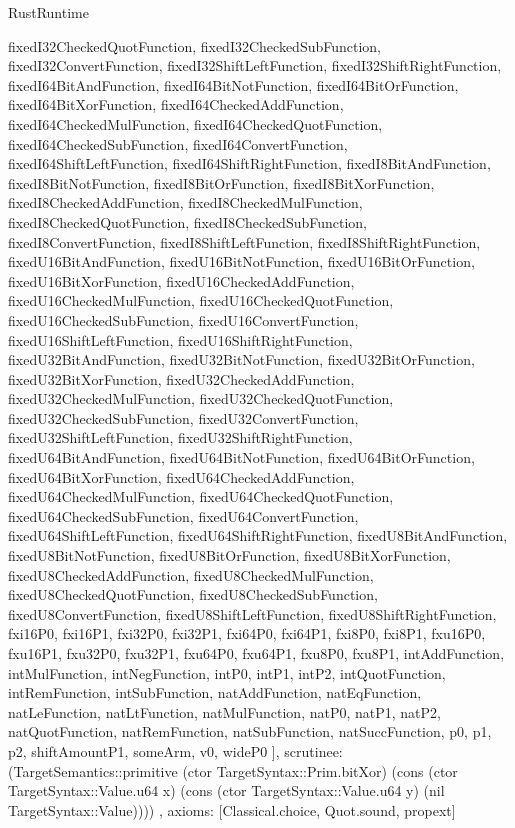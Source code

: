 \begin{lexlean}{RustRuntime}
\begin{semanticmodule}
{{      fixedI32CheckedQuotFunction,
      fixedI32CheckedSubFunction,
      fixedI32ConvertFunction,
      fixedI32ShiftLeftFunction,
      fixedI32ShiftRightFunction,
      fixedI64BitAndFunction,
      fixedI64BitNotFunction,
      fixedI64BitOrFunction,
      fixedI64BitXorFunction,
      fixedI64CheckedAddFunction,
      fixedI64CheckedMulFunction,
      fixedI64CheckedQuotFunction,
      fixedI64CheckedSubFunction,
      fixedI64ConvertFunction,
      fixedI64ShiftLeftFunction,
      fixedI64ShiftRightFunction,
      fixedI8BitAndFunction,
      fixedI8BitNotFunction,
      fixedI8BitOrFunction,
      fixedI8BitXorFunction,
      fixedI8CheckedAddFunction,
      fixedI8CheckedMulFunction,
      fixedI8CheckedQuotFunction,
      fixedI8CheckedSubFunction,
      fixedI8ConvertFunction,
      fixedI8ShiftLeftFunction,
      fixedI8ShiftRightFunction,
      fixedU16BitAndFunction,
      fixedU16BitNotFunction,
      fixedU16BitOrFunction,
      fixedU16BitXorFunction,
      fixedU16CheckedAddFunction,
      fixedU16CheckedMulFunction,
      fixedU16CheckedQuotFunction,
      fixedU16CheckedSubFunction,
      fixedU16ConvertFunction,
      fixedU16ShiftLeftFunction,
      fixedU16ShiftRightFunction,
      fixedU32BitAndFunction,
      fixedU32BitNotFunction,
      fixedU32BitOrFunction,
      fixedU32BitXorFunction,
      fixedU32CheckedAddFunction,
      fixedU32CheckedMulFunction,
      fixedU32CheckedQuotFunction,
      fixedU32CheckedSubFunction,
      fixedU32ConvertFunction,
      fixedU32ShiftLeftFunction,
      fixedU32ShiftRightFunction,
      fixedU64BitAndFunction,
      fixedU64BitNotFunction,
      fixedU64BitOrFunction,
      fixedU64BitXorFunction,
      fixedU64CheckedAddFunction,
      fixedU64CheckedMulFunction,
      fixedU64CheckedQuotFunction,
      fixedU64CheckedSubFunction,
      fixedU64ConvertFunction,
      fixedU64ShiftLeftFunction,
      fixedU64ShiftRightFunction,
      fixedU8BitAndFunction,
      fixedU8BitNotFunction,
      fixedU8BitOrFunction,
      fixedU8BitXorFunction,
      fixedU8CheckedAddFunction,
      fixedU8CheckedMulFunction,
      fixedU8CheckedQuotFunction,
      fixedU8CheckedSubFunction,
      fixedU8ConvertFunction,
      fixedU8ShiftLeftFunction,
      fixedU8ShiftRightFunction,
      fxi16P0,
      fxi16P1,
      fxi32P0,
      fxi32P1,
      fxi64P0,
      fxi64P1,
      fxi8P0,
      fxi8P1,
      fxu16P0,
      fxu16P1,
      fxu32P0,
      fxu32P1,
      fxu64P0,
      fxu64P1,
      fxu8P0,
      fxu8P1,
      intAddFunction,
      intMulFunction,
      intNegFunction,
      intP0,
      intP1,
      intP2,
      intQuotFunction,
      intRemFunction,
      intSubFunction,
      natAddFunction,
      natEqFunction,
      natLeFunction,
      natLtFunction,
      natMulFunction,
      natP0,
      natP1,
      natP2,
      natQuotFunction,
      natRemFunction,
      natSubFunction,
      natSuccFunction,
      p0,
      p1,
      p2,
      shiftAmountP1,
      someArm,
      v0,
      wideP0
    ],
    scrutinee: (TargetSemantics::primitive (ctor TargetSyntax::Prim.bitXor) (cons (ctor TargetSyntax::Value.u64 x) (cons (ctor TargetSyntax::Value.u64 y) (nil TargetSyntax::Value))))
  },
  axioms: [Classical.choice, Quot.sound, propext]
}


\end{semanticmodule}
\end{lexlean}

